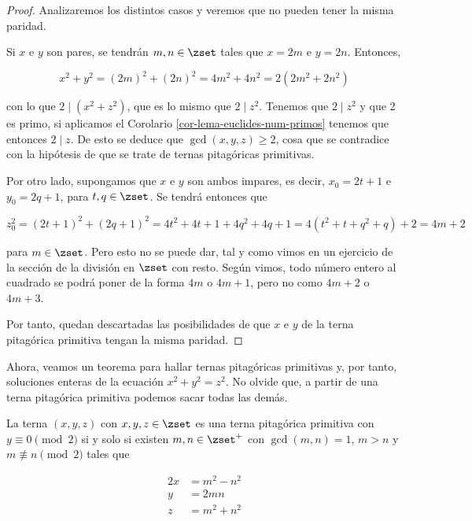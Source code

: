 \begin{proof}
  Analizaremos los distintos casos y veremos que no pueden tener la misma
  paridad.

  Si $x$ e $y$ son pares, se tendrán $m, n \in \zset$ tales que $x = 2m$ e
  $y = 2n$. Entonces,

  $$ x^2 + y^2 = (2m)^2 + (2n)^2 = 4m^2 + 4n^2 = 2(2m^2 + 2n^2) $$

  \noindent con lo que $2 \mid (x^2 + z^2)$, que es lo mismo que $2 \mid
  z^2$. Tenemos que $2 \mid z^2$ y que 2 es primo, si aplicamos el Corolario
  \ref{cor-lema-euclides-num-primos} tenemos que entonces $2 \mid z$. De
  esto se deduce que $\gcd(x, y, z) \geq 2$, cosa que se contradice con la
  hipótesis de que se trate de ternas pitagóricas primitivas.

  Por otro lado, supongamos que $x$ e $y$ son ambos impares, es decir, $x_0
  = 2t + 1$ e $y_0 = 2q + 1$, para $t, q \in \zset$. Se tendrá entonces que

  $$ z_0^2 = (2t + 1)^2 + (2q + 1)^2 = 4t^2 + 4t + 1 + 4q^2 + 4q + 1 = 4(t^2
  + t + q^2 + q) + 2 = 4m + 2 $$

  \noindent para $m \in \zset$. Pero esto no se puede dar, tal y como vimos
  en un ejercicio de la sección de la división en $\zset$ con resto. Según
  vimos, todo número entero al cuadrado se podrá poner de la forma $4m$ o
  $4m + 1$, pero no como $4m + 2$ o $4m + 3$.

  Por tanto, quedan descartadas las posibilidades de que $x$ e $y$ de la
  terna pitagórica primitiva tengan la misma paridad.
\end{proof}

Ahora, veamos un teorema para hallar ternas pitagóricas primitivas y, por
tanto, soluciones enteras de la ecuación $x^2 + y^2 = z^2$. No olvide que, a
partir de una terna pitagórica primitiva podemos sacar todas las demás.


\begin{theorem}
  La terna $(x, y, z)$ con $x, y, z \in \zset$ es una terna pitagórica
  primitiva con $y \equiv 0 \pmod 2$ si y solo si existen $m, n \in
  \zset^{+}$ con $\gcd(m, n) = 1$, $m > n$ y $m \not\equiv n \pmod 2$ tales
  que

  \begin{alignat*}{2}
    x &= m^2 - n^2 \\
    y &= 2mn \\
    z &= m^2 + n^2
  \end{alignat*}
\end{theorem}


